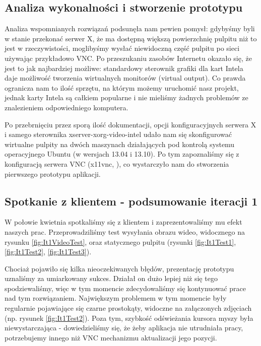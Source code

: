   \subsection{Analiza wykonalności i stworzenie prototypu}
    Analiza wspomnianych rozwiązań podsunęła nam pewien pomysł: gdybyśmy byli w stanie przekonać serwer X, że ma dostępną większą powierzchnię pulpitu niż to jest w rzeczywistości, moglibyśmy wysłać niewidoczną część pulpitu po sieci używając przykładowo VNC. Po przeszukaniu zasobów Internetu okazało się, że jest to jak najbardziej możliwe: standardowy sterownik grafiki dla kart Intela daje możliwość tworzenia wirtualnych monitorów (virtual output). Co prawda ogranicza nam to ilość sprzętu, na którym możemy uruchomić nasz projekt, jednak karty Intela są całkiem popularne i nie mieliśmy żadnych problemów ze znalezieniem odpowiedniego komputera.

    Po przebrnięciu przez sporą ilość dokumentacji, opcji konfiguracyjnych serwera X i samego sterownika xserver-xorg-video-intel udało nam się skonfigurować wirtualne pulpity na dwóch maszynach działających pod kontrolą systemu operacyjnego Ubuntu (w wersjach 13.04 i 13.10). Po tym zapoznaliśmy się z konfiguracją serwera VNC (x11vnc, \cite{x11vncProj}), co wystarczyło nam do stworzenia pierwszego prototypu aplikacji.

  \subsection{Spotkanie z klientem - podsumowanie iteracji 1}
    W połowie kwietnia spotkaliśmy się z klientem i zaprezentowaliśmy mu efekt naszych prac. Przeprowadziliśmy test wysyłania obrazu wideo, widocznego na rysunku \ref{fig:It1VideoTest}, oraz statycznego pulpitu (rysunki \ref{fig:It1Test1}, \ref{fig:It1Test2}, \ref{fig:It1Test3}).

    Chociaż pojawiło się kilka nieoczekiwanych błędów, prezentację prototypu uznaliśmy za umiarkowany sukces. Działał on dużo lepiej niż się tego spodziewaliśmy, więc w tym momencie zdecydowaliśmy się kontynuować prace nad tym rozwiązaniem. Największym problemem w tym momencie były regularnie pojawiające się czarne prostokąty, widoczne na załączonych zdjęciach (np. rysunek \ref{fig:It1Test2}). Poza tym, szybkość odświeżania kursora myszy była niewystarczająca - dowiedzieliśmy się, że żeby aplikacja nie utrudniała pracy, potrzebujemy innego niż VNC mechanizmu aktualizacji jego pozycji.

    \vfill
    \pagebreak

